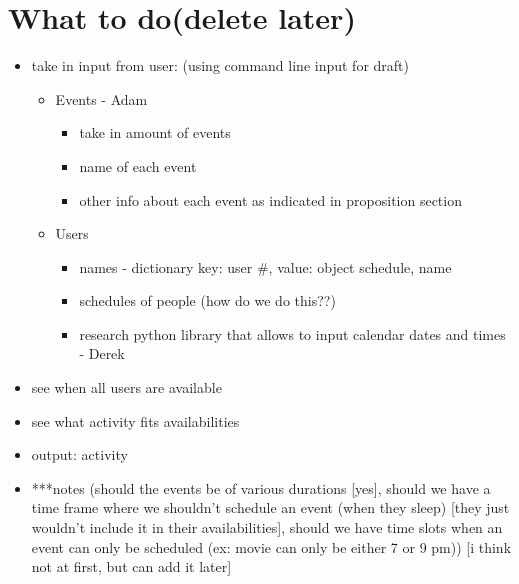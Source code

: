 \documentclass[pdftex,10pt,a4paper]{article}
\numberwithin{equation}{section} %
\begin{document}
\section*{What to do(delete later)}
\begin{itemize}
    \item take in input from user: (using command line input for draft)
    \begin{itemize}
        \item Events - Adam
        \begin{itemize}
            \item take in amount of events
            \item name of each event
            \item other info about each event as indicated in proposition section
        \end{itemize}
        \item Users 
            \begin{itemize}
            \item names - dictionary key: user #, value: object {schedule, name}
            \item schedules of people (how do we do this??)
            \item research python library that allows to input calendar dates and times - Derek
            \end{itemize}
    \end{itemize}
    \item see when all users are available
    \item see what activity fits availabilities
    \item output: activity
    \item ***notes (should the events be of various durations [yes], should we have a time frame where we shouldn't schedule an event (when they sleep) [they just wouldn't include it in their availabilities], should we have time slots when an event can only be scheduled (ex: movie can only be either 7 or 9 pm)) [i think not at first, but can add it later]
\end{itemize}
\end{document}
